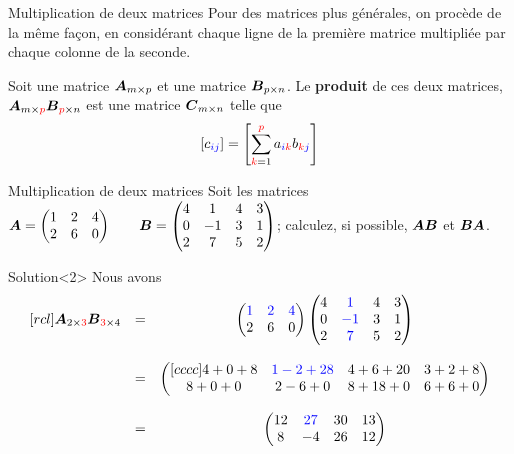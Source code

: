 \documentclass[french, handout]{beamer}
\begin{document}
\begin{frame}{Multiplication de deux matrices}
Pour des matrices plus générales, on procède de la même façon, en considérant chaque ligne
de la première matrice multipliée par chaque colonne de la seconde.\vfill

Soit une matrice $\boldsymbol{A}_{m\times p}$ et une matrice $\boldsymbol{B}_{p\times n}$.  
Le \textbf{produit} de ces deux matrices, 
$\boldsymbol{A}_{m\times\textcolor{red}{p}}\boldsymbol{B}_{\textcolor{red}{p}\times n}$ est une matrice $\boldsymbol{C}_{m\times n}$ telle que
\huge
\[
[c_{\textcolor{blue}{ij}}] = \left[\sum_{\textcolor{red}{k}=1}^{\textcolor{red}{p}} 
a_{\textcolor{blue}{i}\textcolor{red}{k}} 
b_{\textcolor{red}{k}\textcolor{blue}{j}}\right]
\]
\end{frame}

\begin{frame}{Multiplication de deux matrices}
Soit les matrices
$\displaystyle
\boldsymbol{A} = \begin{pmatrix}
	1 & 2 & 4 \\
	2 & 6 & 0
	\end{pmatrix}
\qquad
\boldsymbol{B} = \begin{pmatrix}
	4 & 1 & 4 & 3\\
	0 & -1 & 3 & 1 \\
	2 & 7 & 5 & 2
	\end{pmatrix}
$;
calculez, si possible, $\boldsymbol{A}\boldsymbol{B}$ et $\boldsymbol{B}\boldsymbol{A}$.

\begin{block}{Solution}<2>
Nous avons
\[
\begin{matrix}[rcl]
\boldsymbol{A}_{2\times\textcolor{red}{3}}\boldsymbol{B}_{\textcolor{red}{3}\times 4} & = & \begin{pmatrix}
	\textcolor{blue}{1} & \textcolor{blue}{2} & \textcolor{blue}{4} \\
	2 & 6 & 0
	\end{pmatrix}
	\begin{pmatrix}
	4 & \textcolor{blue}{1} & 4 & 3\\
	0 & \textcolor{blue}{-1} & 3 & 1 \\
	2 & \textcolor{blue}{7} & 5 & 2
	\end{pmatrix} \\
	\\
	&=& \begin{pmatrix}[cccc]
	4+0+8 & \textcolor{blue}{1-2+28} & 4+6+20 & 3 + 2 + 8 \\
	8+0+0 & 2-6+0 & 8+18+0 & 6+6+0
	\end{pmatrix}\\
	\\
	&=& \begin{pmatrix}
	12 & \textcolor{blue}{27} & 30 & 13 \\
	8 & -4 & 26 & 12
	\end{pmatrix}
	\end{matrix}
\]
\end{block}
\end{frame}
\end{document}
